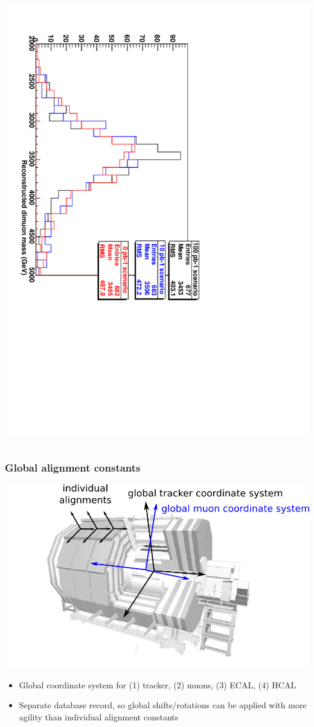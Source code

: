 \documentclass[compress]{beamer}
\begin{document}
\begin{frame}
\begin{columns}
\vspace{0.5 cm}
\includegraphics[height=\linewidth, angle=90]{newscenarios_zprimetest.pdf}
\end{columns}
\end{frame}

\begin{frame}
\frametitle{Global alignment constants}

\vfill
\includegraphics[width=\linewidth]{global_coordinate_systems.png}

\scriptsize
\begin{itemize}
\item Global coordinate system for (1) tracker, (2) muons, (3) ECAL, (4) HCAL
\item Separate database record, so global shifts/rotations can be
applied with more agility than individual alignment constants
\end{itemize}
\end{frame}
\end{document}
